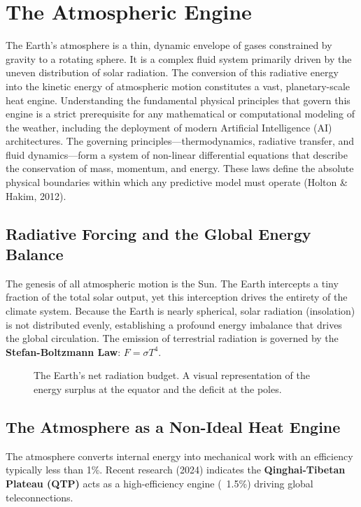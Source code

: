 \chapter{The Atmospheric Engine}

The Earth’s atmosphere is a thin, dynamic envelope of gases constrained by gravity to a rotating sphere. It is a complex fluid system primarily driven by the uneven distribution of solar radiation. The conversion of this radiative energy into the kinetic energy of atmospheric motion constitutes a vast, planetary-scale heat engine. Understanding the fundamental physical principles that govern this engine is a strict prerequisite for any mathematical or computational modeling of the weather, including the deployment of modern Artificial Intelligence (AI) architectures. The governing principles—thermodynamics, radiative transfer, and fluid dynamics—form a system of non-linear differential equations that describe the conservation of mass, momentum, and energy. These laws define the absolute physical boundaries within which any predictive model must operate (Holton \& Hakim, 2012).

\section{Radiative Forcing and the Global Energy Balance}
The genesis of all atmospheric motion is the Sun. The Earth intercepts a tiny fraction of the total solar output, yet this interception drives the entirety of the climate system. Because the Earth is nearly spherical, solar radiation (insolation) is not distributed evenly, establishing a profound energy imbalance that drives the global circulation. The emission of terrestrial radiation is governed by the \textbf{Stefan-Boltzmann Law}: $F = \sigma T^4$.

\begin{figure}[H]
    \centering
    \caption{The Earth's net radiation budget. A visual representation of the energy surplus at the equator and the deficit at the poles.}
    \label{fig:radiation_budget}
\end{figure}

\section{The Atmosphere as a Non-Ideal Heat Engine}
The atmosphere converts internal energy into mechanical work with an efficiency typically less than 1\%. Recent research (2024) indicates the \textbf{Qinghai-Tibetan Plateau (QTP)} acts as a high-efficiency engine (~1.5\%) driving global teleconnections.

